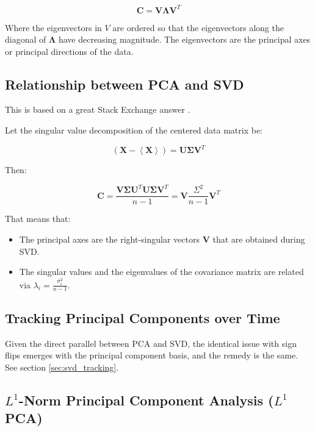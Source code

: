\begin{equation}
\mathbf{C} = \mathbf{V}\mathbf{\Lambda}\mathbf{V}^T
\end{equation}

Where the eigenvectors in $V$ are ordered so that the eigenvectors along the diagonal of $\mathbf{\Lambda}$ have decreasing magnitude. The eigenvectors are the principal axes or principal directions of the data.


\subsection{Relationship between PCA and SVD}
\label{sec:pcasvd}
This is based on a great Stack Exchange answer \cite{amoeba2015svdpca}.

Let the singular value decomposition of the centered data matrix be:

\begin{equation}
\left(\mathbf{X}-\left<\mathbf{X}\right>\right) = \mathbf{U}\mathbf{\Sigma}\mathbf{V}^T
\end{equation}

Then:

\begin{equation}
\mathbf{C} = \frac{\mathbf{V\Sigma U}^T\mathbf{U\Sigma V}^T}{n-1} = \mathbf{V}\frac{\Sigma^2}{n-1}\mathbf{V}^T
\end{equation}

That means that:

\begin{itemize}
\item The principal axes are the right-singular vectors $\mathbf{V}$ that are obtained during SVD.
\item The singular values and the eigenvalues of the covariance matrix are related via $\lambda_i = \frac{\sigma_i^2}{n-1}$.
\end{itemize}



\subsection{Tracking Principal Components over Time}
Given the direct parallel between PCA and SVD, the identical issue with sign flips emerges with the principal component basis, and the remedy is the same. See section \ref{sec:svd_tracking}.


\subsection{$L^1$-Norm Principal Component Analysis ($L^1$ PCA)}
\label{sec:l1pca}

